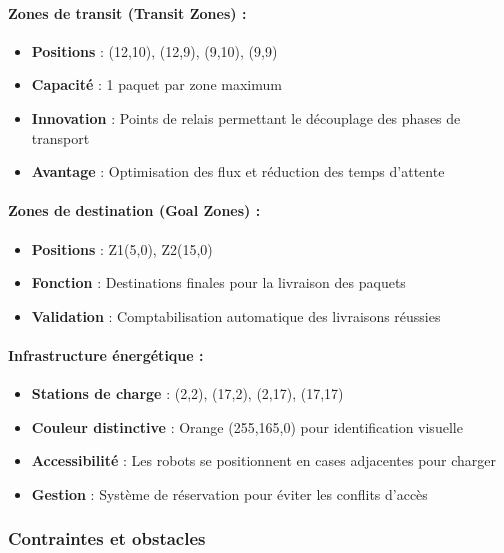 \documentclass[12pt,a4paper]{article}
\begin{document}
\paragraph{Zones de transit (Transit Zones) :}
\begin{itemize}
    \item \textbf{Positions} : (12,10), (12,9), (9,10), (9,9)
    \item \textbf{Capacité} : 1 paquet par zone maximum
    \item \textbf{Innovation} : Points de relais permettant le découplage des phases de transport
    \item \textbf{Avantage} : Optimisation des flux et réduction des temps d'attente
\end{itemize}

\paragraph{Zones de destination (Goal Zones) :}
\begin{itemize}
    \item \textbf{Positions} : Z1(5,0), Z2(15,0)
    \item \textbf{Fonction} : Destinations finales pour la livraison des paquets
    \item \textbf{Validation} : Comptabilisation automatique des livraisons réussies
\end{itemize}

\paragraph{Infrastructure énergétique :}
\begin{itemize}
    \item \textbf{Stations de charge} : (2,2), (17,2), (2,17), (17,17)
    \item \textbf{Couleur distinctive} : Orange (255,165,0) pour identification visuelle
    \item \textbf{Accessibilité} : Les robots se positionnent en cases adjacentes pour charger
    \item \textbf{Gestion} : Système de réservation pour éviter les conflits d'accès
\end{itemize}

\subsubsection{Contraintes et obstacles}
\end{document}
